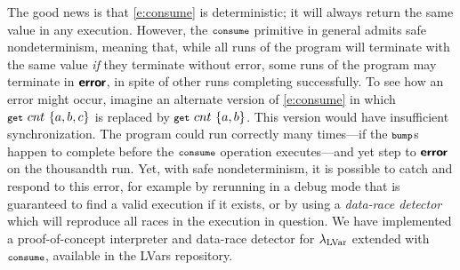 
The good news is that \eqref{e:consume} is deterministic; it
will always return the same value in any execution.  However,
the  $\mbox{\footnotesize \texttt{consume}}$ primitive in general admits safe nondeterminism,
meaning that, while all runs of the program will terminate with the
same value {\em if} they terminate without error, some runs of the
program may terminate in $\textbf{\textsf{error}}$, in spite of other runs completing
successfully.
To see how an error might occur, imagine an alternate version of \eqref{e:consume} 
in which $\mbox{\footnotesize \texttt{get}}~cnt~\{a,b,c\}$ is replaced
by $\mbox{\footnotesize \texttt{get}}~cnt~\{a,b\}$.  This version would have
insufficient synchronization.  The program could run correctly many
times---if the $\mbox{\footnotesize \texttt{bump}}$s happen to complete before the
$\mbox{\footnotesize \texttt{consume}}$ operation executes---and yet step to $\textbf{\textsf{error}}$ on the
thousandth run.
%
{Yet, with safe nondeterminism, it is possible to catch and respond to
this error, for example by rerunning in a debug mode that is guaranteed
to find a valid execution if it exists, or by using a {\em data-race detector} which will
reproduce all races in the execution in question.
%
We have implemented a proof-of-concept interpreter and data-race detector for
$\textup{\ensuremath{\lambda_{\textrm{LVar}}}}$ extended with $\mbox{\footnotesize \texttt{consume}}$, available in the LVars repository}.

